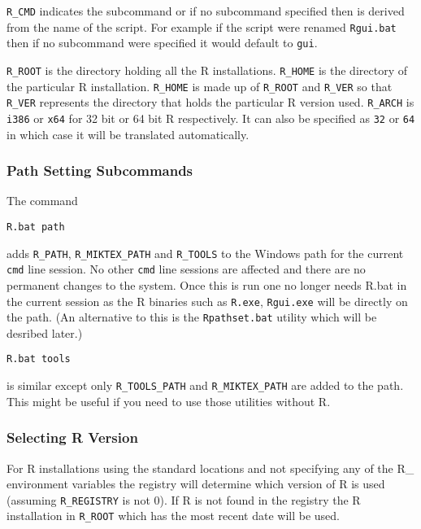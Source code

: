\texttt{R\_CMD} indicates the subcommand or if no subcommand specified
then is derived from the name of the script. For example if the script
were renamed \texttt{Rgui.bat} then if no subcommand were specified it
would default to \texttt{gui}.

\texttt{R\_ROOT} is the directory holding all the R installations.
\texttt{R\_HOME} is the directory of the particular R installation.
\texttt{R\_HOME} is made up of \texttt{R\_ROOT} and \texttt{R\_VER} so
that \texttt{R\_VER} represents the directory that holds the particular
R version used. \texttt{R\_ARCH} is \texttt{i386} or \texttt{x64} for 32
bit or 64 bit R respectively. It can also be specified as \texttt{32} or
\texttt{64} in which case it will be translated automatically.

\subsubsection{Path Setting Subcommands}

The command

\begin{verbatim}
R.bat path
\end{verbatim}

adds \texttt{R\_PATH}, \texttt{R\_MIKTEX\_PATH} and \texttt{R\_TOOLS} to
the Windows path for the current \texttt{cmd} line session. No other
\texttt{cmd} line sessions are affected and there are no permanent
changes to the system. Once this is run one no longer needs R.bat in the
current session as the R binaries such as \texttt{R.exe},
\texttt{Rgui.exe} will be directly on the path. (An alternative to this
is the \texttt{Rpathset.bat} utility which will be desribed later.)

\begin{verbatim}
R.bat tools
\end{verbatim}

is similar except only \texttt{R\_TOOLS\_PATH} and
\texttt{R\_MIKTEX\_PATH} are added to the path. This might be useful if
you need to use those utilities without R.

\subsubsection{Selecting R Version}

For R installations using the standard locations and not specifying any
of the R\_ environment variables the registry will determine which
version of R is used (assuming \texttt{R\_REGISTRY} is not 0). If R is
not found in the registry the R installation in \texttt{R\_ROOT} which
has the most recent date will be used.

